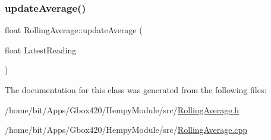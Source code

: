 \subsubsection{\texorpdfstring{update\+Average()}{updateAverage()}\hspace{0.1cm}{\footnotesize\ttfamily [4/4]}}
{\footnotesize\ttfamily float Rolling\+Average\+::update\+Average (\begin{DoxyParamCaption}\item[{float}]{Latest\+Reading }\end{DoxyParamCaption})}



The documentation for this class was generated from the following files\+:\begin{DoxyCompactItemize}
\item 
/home/bit/\+Apps/\+Gbox420/\+Hempy\+Module/src/\hyperlink{_hempy_module_2src_2_rolling_average_8h}{Rolling\+Average.\+h}\item 
/home/bit/\+Apps/\+Gbox420/\+Hempy\+Module/src/\hyperlink{_hempy_module_2src_2_rolling_average_8cpp}{Rolling\+Average.\+cpp}\end{DoxyCompactItemize}
